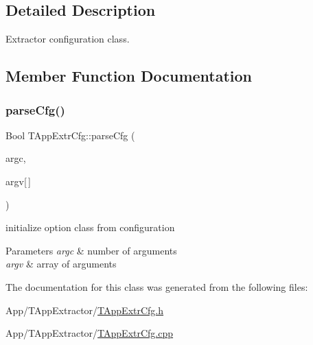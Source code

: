 \subsection{Detailed Description}
Extractor configuration class. 

\subsection{Member Function Documentation}
\mbox{\label{class_t_app_extr_cfg_a684a727a13a5ebc0ab43e5193237ff12}} 
\subsubsection{\texorpdfstring{parse\+Cfg()}{parseCfg()}}
{\footnotesize\ttfamily Bool T\+App\+Extr\+Cfg\+::parse\+Cfg (\begin{DoxyParamCaption}\item[{Int}]{argc,  }\item[{T\+Char $\ast$}]{argv\mbox{[}$\,$\mbox{]} }\end{DoxyParamCaption})}



initialize option class from configuration 


\begin{DoxyParams}{Parameters}
{\em argc} & number of arguments \\
\hline
{\em argv} & array of arguments \\
\hline
\end{DoxyParams}


The documentation for this class was generated from the following files\+:\begin{DoxyCompactItemize}
\item 
App/\+T\+App\+Extractor/\hyperlink{_t_app_extr_cfg_8h}{T\+App\+Extr\+Cfg.\+h}\item 
App/\+T\+App\+Extractor/\hyperlink{_t_app_extr_cfg_8cpp}{T\+App\+Extr\+Cfg.\+cpp}\end{DoxyCompactItemize}
